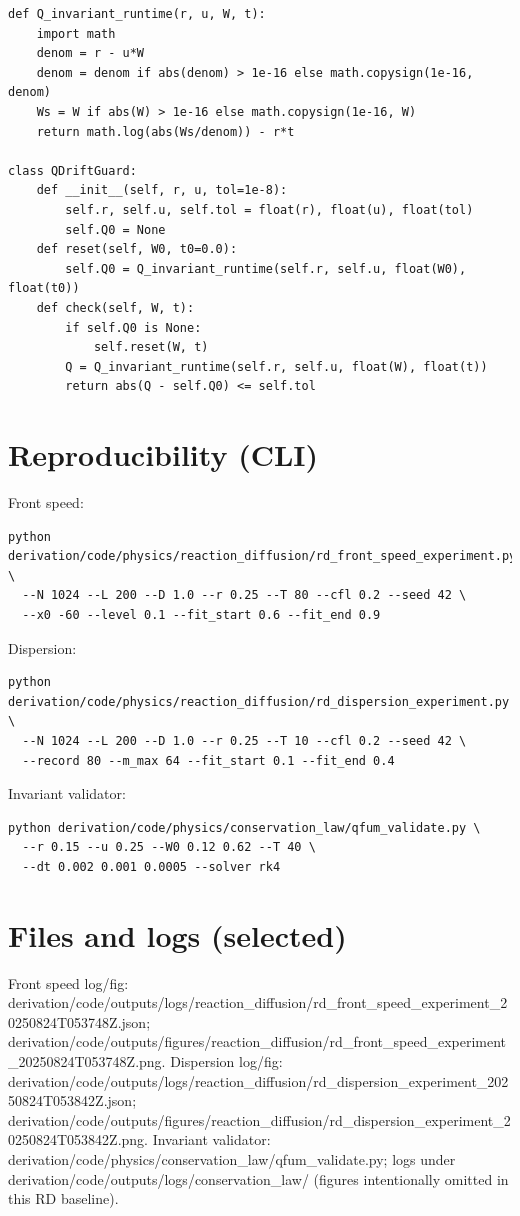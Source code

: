 \documentclass[11pt]{article}
\begin{document}
\begin{verbatim}
def Q_invariant_runtime(r, u, W, t):
    import math
    denom = r - u*W
    denom = denom if abs(denom) > 1e-16 else math.copysign(1e-16, denom)
    Ws = W if abs(W) > 1e-16 else math.copysign(1e-16, W)
    return math.log(abs(Ws/denom)) - r*t

class QDriftGuard:
    def __init__(self, r, u, tol=1e-8):
        self.r, self.u, self.tol = float(r), float(u), float(tol)
        self.Q0 = None
    def reset(self, W0, t0=0.0):
        self.Q0 = Q_invariant_runtime(self.r, self.u, float(W0), float(t0))
    def check(self, W, t):
        if self.Q0 is None:
            self.reset(W, t)
        Q = Q_invariant_runtime(self.r, self.u, float(W), float(t))
        return abs(Q - self.Q0) <= self.tol
\end{verbatim}

\section{Reproducibility (CLI)}
Front speed:
\begin{verbatim}
python derivation/code/physics/reaction_diffusion/rd_front_speed_experiment.py \
  --N 1024 --L 200 --D 1.0 --r 0.25 --T 80 --cfl 0.2 --seed 42 \
  --x0 -60 --level 0.1 --fit_start 0.6 --fit_end 0.9
\end{verbatim}
Dispersion:
\begin{verbatim}
python derivation/code/physics/reaction_diffusion/rd_dispersion_experiment.py \
  --N 1024 --L 200 --D 1.0 --r 0.25 --T 10 --cfl 0.2 --seed 42 \
  --record 80 --m_max 64 --fit_start 0.1 --fit_end 0.4
\end{verbatim}
Invariant validator:
\begin{verbatim}
python derivation/code/physics/conservation_law/qfum_validate.py \
  --r 0.15 --u 0.25 --W0 0.12 0.62 --T 40 \
  --dt 0.002 0.001 0.0005 --solver rk4
\end{verbatim}

\section{Files and logs (selected)}
Front speed log/fig: derivation/code/outputs/logs/reaction_diffusion/rd_front_speed_experiment_20250824T053748Z.json;
derivation/code/outputs/figures/reaction_diffusion/rd_front_speed_experiment_20250824T053748Z.png.
Dispersion log/fig: derivation/code/outputs/logs/reaction_diffusion/rd_dispersion_experiment_20250824T053842Z.json;
derivation/code/outputs/figures/reaction_diffusion/rd_dispersion_experiment_20250824T053842Z.png.
Invariant validator: derivation/code/physics/conservation_law/qfum_validate.py; logs under derivation/code/outputs/logs/conservation_law/ (figures intentionally omitted in this RD baseline).
\end{document}
